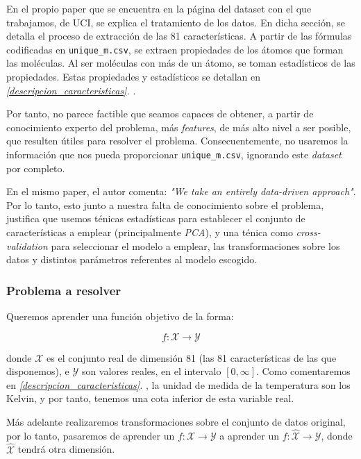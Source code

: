 \documentclass[11pt]{article}
\begin{document}
En el propio paper \cite{original_paper_reg:paper} que se encuentra en la página del dataset con el que trabajamos, de UCI, se explica el tratamiento de los datos. En dicha sección, se detalla el proceso de extracción de las 81 características. A partir de las fórmulas codificadas en \lstinline{unique_m.csv}, se extraen propiedades de los átomos que forman las moléculas. Al ser moléculas con más de un átomo, se toman estadísticos de las propiedades. Estas propiedades y estadísticos se detallan en \emph{\ref{descripcion_caracteristicas}. }.

Por tanto, no parece factible que seamos capaces de obtener, a partir de conocimiento experto del problema, más \emph{features}, de más alto nivel a ser posible, que resulten útiles para resolver el problema. Consecuentemente, no usaremos la información que nos pueda proporcionar \lstinline{unique_m.csv}, ignorando este \emph{dataset} por completo.

En el mismo paper, el autor comenta: \emph{"We take an entirely data-driven approach"}. Por lo tanto, esto junto a nuestra falta de conocimiento sobre el problema, justifica que usemos ténicas estadísticas para establecer el conjunto de características a emplear (principalmente \emph{PCA}), y una ténica como \emph{cross-validation} para seleccionar el modelo a emplear, las transformaciones sobre los datos y distintos parámetros referentes al modelo escogido.

\pagebreak

\subsubsection{Problema a resolver}

Queremos aprender una función objetivo de la forma:

$$f: \mathcal{X} \rightarrow \mathcal{Y}$$

donde $\mathcal{X}$ es el conjunto real de dimensión 81 (las 81 características de las que disponemos), e $\mathcal{Y}$ son valores reales, en el intervalo $[0, \infty]$. Como comentaremos en \emph{\ref{descripcion_caracteristicas}. }, la unidad de medida de la temperatura son los Kelvin, y por tanto, tenemos una cota inferior de esta variable real.

Más adelante realizaremos transformaciones sobre el conjunto de datos original, por lo tanto, pasaremos de aprender un $f: \mathcal{X} \rightarrow \mathcal{Y}$ a aprender un $f: \hat{\mathcal{X}} \rightarrow \mathcal{Y}$, donde $\hat{\mathcal{X}}$ tendrá otra dimensión.
\end{document}
